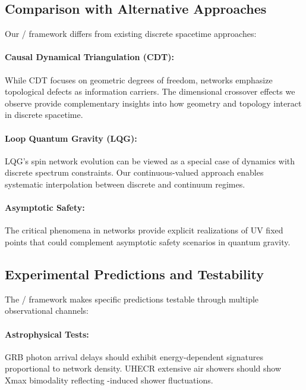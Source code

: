 \subsection{Comparison with Alternative Approaches}

Our \posp{}/\saturon{} framework differs from existing discrete spacetime approaches:

\paragraph{Causal Dynamical Triangulation (CDT):}
While CDT focuses on geometric degrees of freedom, \saturon{} networks emphasize 
topological defects as information carriers. The dimensional crossover effects 
we observe provide complementary insights into how geometry and topology 
interact in discrete spacetime.

\paragraph{Loop Quantum Gravity (LQG):}
LQG's spin network evolution can be viewed as a special case of \saturon{} 
dynamics with discrete spectrum constraints. Our continuous-valued approach 
enables systematic interpolation between discrete and continuum regimes.

\paragraph{Asymptotic Safety:}
The critical phenomena in \saturon{} networks provide explicit realizations 
of UV fixed points that could complement asymptotic safety scenarios in 
quantum gravity.

\subsection{Experimental Predictions and Testability}

The \posp{}/\saturon{} framework makes specific predictions testable through 
multiple observational channels:

\paragraph{Astrophysical Tests:}
GRB photon arrival delays should exhibit energy-dependent signatures proportional 
to \saturon{} network density. UHECR extensive air showers should show 
Xmax bimodality reflecting \saturon{}-induced shower fluctuations.

